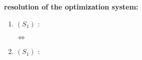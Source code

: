 \documentclass[unknownkeysallowed]{beamer}
\begin{document}
\begin{frame}
\bigskip
\bigskip
\begin{center}{
\LARGE\color{marron}
\textbf{resolution of the optimization system:}
\textbf{ }\\
\vspace{0.5cm}
}

\color{marron}
\end{center}


\begin{enumerate}
        \item $(S_1)$ : 



$\Leftrightarrow$  \\


        \item $(S_1)$ : 
    \end{enumerate}





\end{frame}
\end{document}
